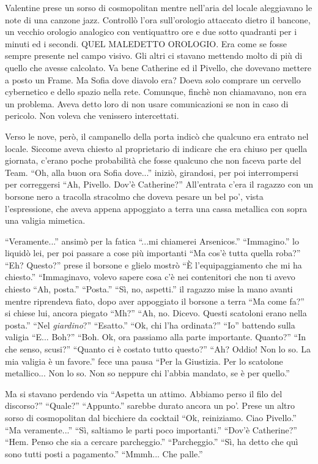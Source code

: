     Valentine prese un sorso di cosmopolitan mentre nell'aria del locale aleggiavano le note di una canzone jazz.
    Controllò l'ora sull'orologio attaccato dietro il bancone, un vecchio orologio analogico con ventiquattro ore e due
    sotto quadranti per i minuti ed i secondi. QUEL MALEDETTO OROLOGIO. Era come se fosse sempre presente nel campo
    visivo. Gli altri ci stavano mettendo molto di più di quello che
    avesse calcolato. Va bene Catherine ed il Pivello, che dovevano mettere a posto un Frame. Ma Sofia dove diavolo era?
    Doeva solo comprare un cervello cybernetico e dello spazio nella rete. Comunque, finchè non chiamavano, non era un
    problema. Aveva detto loro di non usare comunicazioni se non in caso di pericolo. Non voleva che venissero
    intercettati.

    Verso le nove, però, il campanello della porta indicò che qualcuno era entrato nel locale. Siccome aveva chiesto al
    proprietario di indicare che era chiuso per quella giornata, c'erano poche probabilità che fosse qualcuno che non
    faceva parte del Team. ``Oh, alla buon ora Sofia dove...'' iniziò, girandosi, per poi interrompersi per correggersi
    ``Ah, Pivello. Dov'è Catherine?'' All'entrata c'era il ragazzo con un borsone nero a tracolla stracolmo che doveva pesare un bel
    po', vista l'espressione, che aveva appena appoggiato a terra una cassa metallica con sopra una valigia mimetica.

    ``Veramente...'' ansimò per la fatica ``...mi chiamerei Arsenicos.'' ``Immagino.'' lo liquidò lei, per poi passare a
    cose più importanti ``Ma cos'è tutta quella roba?'' ``Eh? Questo?'' prese il borsone e glielo mostrò ``È
    l'equipaggiamento che mi ha chiesto.'' ``Immaginavo, volevo sapere cosa c'è nei contenitori che non ti avevo chiesto
    ``Ah, posta.'' ``Posta.'' ``Sì, no, aspetti.'' il ragazzo mise la mano avanti mentre riprendeva fiato, dopo aver
    appoggiato il borsone a terra ``Ma come fa?'' si chiese lui, ancora piegato ``Mh?'' ``Ah, no. Dicevo. Questi
    scatoloni erano nella posta.'' ``Nel \emph{giardino}?'' ``Esatto.'' ``Ok, chi l'ha ordinata?'' ``Io'' battendo sulla
    valigia ``E... Boh?'' ``Boh. Ok, ora passiamo alla parte importante. Quanto?'' ``In che senso, scusi?'' ``Quanto ci è
    costato tutto questo?'' ``Ah? Oddio! Non lo so. La mia valigia è un favore.'' fece una pausa ``Per la Giustizia. Per
    lo scatolone metallico... Non lo so. Non so neppure chi l'abbia mandato, se è per quello.''

    Ma si stavano perdendo via ``Aspetta un attimo. Abbiamo perso il filo del discorso?'' ``Quale?'' ``Appunto.'' sarebbe
    durato ancora un po'. Prese un altro sorso di cosmopolitan dal bicchiere da cocktail ``Ok, reiniziamo. Ciao
    Pivello.'' ``Ma veramente...'' ``Sì, saltiamo le parti poco importanti.'' ``Dov'è Catherine?'' ``Hem. Penso che sia a
    cercare parcheggio.'' ``Parcheggio.'' ``Sì, ha detto che quì sono tutti posti a pagamento.'' ``Mmmh... Che palle.'' 

